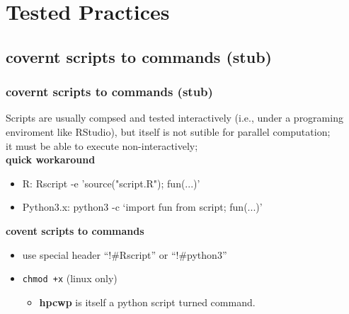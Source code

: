 \documentclass{beamer}
\begin{document}
\section{Tested Practices}
\subsection{covernt scripts to commands (stub)}
\begin{frame}
  \frametitle{covernt scripts to commands (stub)}
  Scripts are usually compsed and tested interactively (i.e., under a
  programing enviroment like RStudio), but itself is not sutible for
  parallel computation; \\
  it must be able to execute non-interactively; \\
  \textbf{quick workaround}
  \begin{itemize}
  \item R: Rscript -e 'source("script.R"); fun(...)'
  \item Python3.x: python3 -c `import fun from script; fun(...)'
  \end{itemize}
  \textbf{covent scripts to commands}
  \begin{itemize}
  \item use special header ``!\#Rscript'' or ``!\#python3''
  \item \texttt{chmod +x} (linux only)
    \begin{itemize}
    \item \textbf{hpcwp} is itself a python script turned command.
    \end{itemize}
  \end{itemize}
\end{frame}
\end{document}
